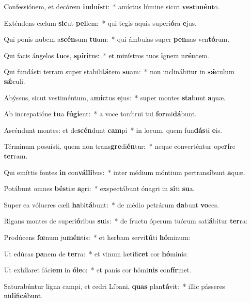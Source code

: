 \item Confessiónem, et decórem \textbf{ind}u\textbf{ís}ti:~* amíctus lúmine sicut \textbf{ves}ti\textbf{mén}to.
\item Exténdens cælum \textbf{sic}ut \textbf{pel}lem:~* qui tegis aquis superi\textbf{ó}ra \textbf{e}jus.
\item Qui ponis nubem a\textbf{scén}sum \textbf{tu}um:~* qui ámbulas super \textbf{pen}nas ven\textbf{tó}rum.
\item Qui facis ángelos \textbf{tu}os, \textbf{spí}\textbf{ri}tus:~* et minístros tuos \textbf{i}gnem u\textbf{rén}tem.
\item Qui fundásti terram super stabili\textbf{tá}tem \textbf{su}am:~* non inclinábitur in \textbf{sǽ}culum \textbf{sǽ}culi.
\item Abýssus, sicut vestiméntum, a\textbf{míc}tus \textbf{e}jus:~* super montes \textbf{sta}bunt \textbf{a}quæ.
\item Ab increpatióne \textbf{tu}a \textbf{fú}\textbf{gi}ent:~* a voce tonítrui tui \textbf{for}mi\textbf{dá}bunt.
\item Ascéndunt montes: et de\textbf{scén}dunt \textbf{cam}pi~* in locum, quem fun\textbf{dás}ti \textbf{e}is.
\item Términum posuísti, quem non trans\textbf{gre}di\textbf{én}tur:~* neque converténtur ope\textbf{rí}re \textbf{ter}ram.
\item Qui emíttis fontes \textbf{in} con\textbf{vál}\textbf{li}bus:~* inter médium móntium pertrans\textbf{í}bunt \textbf{a}quæ.
\item Potábunt omnes \textbf{bés}tiæ \textbf{a}gri:~* exspectábunt ónagri in \textbf{si}ti \textbf{su}a.
\item Super ea vólucres cæli \textbf{ha}bi\textbf{tá}bunt:~* de médio petrárum \textbf{da}bunt \textbf{vo}ces.
\item Rigans montes de superi\textbf{ó}ribus \textbf{su}is:~* de fructu óperum tuórum sati\textbf{á}bitur \textbf{ter}ra:
\item Prodúcens \textbf{fœ}num ju\textbf{mén}tis:~* et herbam servi\textbf{tú}ti \textbf{hó}minum:
\item Ut edúcas \textbf{pa}nem de \textbf{ter}ra:~* et vinum lætífi\textbf{cet} cor \textbf{hó}minis:
\item Ut exhílaret fáci\textbf{em} in \textbf{ó}\textbf{le}o:~* et panis cor hómi\textbf{nis} con\textbf{fír}met.
\item Saturabúntur ligna campi, et cedri Líbani, \textbf{quas} plan\textbf{tá}vit:~* illic pásseres ni\textbf{di}fi\textbf{cá}bunt.
